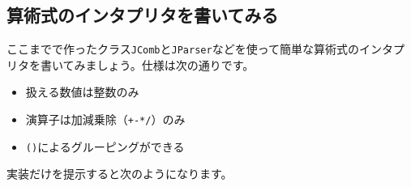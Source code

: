 \hypertarget{chapter6-ux7b97ux8853ux5f0fux306eux30a4ux30f3ux30bfux30d7ux30eaux30bfux3092ux66f8ux3044ux3066ux307fux308b}{%
\subsection{算術式のインタプリタを書いてみる}\label{chapter6-ux7b97ux8853ux5f0fux306eux30a4ux30f3ux30bfux30d7ux30eaux30bfux3092ux66f8ux3044ux3066ux307fux308b}}

ここまでで作ったクラス\texttt{JComb}と\texttt{JParser}などを使って簡単な算術式のインタプリタを書いてみましょう。仕様は次の通りです。

\begin{itemize}
\tightlist
\item
  扱える数値は整数のみ
\item
  演算子は加減乗除（\texttt{+\textbar{}-\textbar{}*\textbar{}/}）のみ
\item
  \texttt{()}によるグルーピングができる
\end{itemize}

実装だけを提示すると次のようになります。

